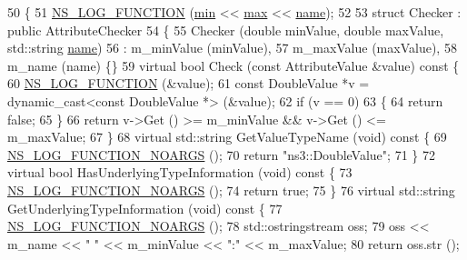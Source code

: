\begin{DoxyCode}
50 \{
51   \hyperlink{log-macros-disabled_8h_a90b90d5bad1f39cb1b64923ea94c0761}{NS\_LOG\_FUNCTION} (\hyperlink{80211b_8c_ac6afabdc09a49a433ee19d8a9486056d}{min} << \hyperlink{80211b_8c_affe776513b24d84b39af8ab0930fef7f}{max} << \hyperlink{generate__test__data__lte__spectrum__model_8m_ab74e6bf80237ddc4109968cedc58c151}{name});
52 
53   \textcolor{keyword}{struct }Checker : \textcolor{keyword}{public} AttributeChecker
54   \{
55     Checker (\textcolor{keywordtype}{double} minValue, \textcolor{keywordtype}{double} maxValue, std::string \hyperlink{generate__test__data__lte__spectrum__model_8m_ab74e6bf80237ddc4109968cedc58c151}{name})
56       : m\_minValue (minValue),
57         m\_maxValue (maxValue),
58         m\_name (name) \{\}
59     \textcolor{keyword}{virtual} \textcolor{keywordtype}{bool} Check (\textcolor{keyword}{const} AttributeValue &value)\textcolor{keyword}{ const }\{
60       \hyperlink{log-macros-disabled_8h_a90b90d5bad1f39cb1b64923ea94c0761}{NS\_LOG\_FUNCTION} (&value);
61       \textcolor{keyword}{const} DoubleValue *v = \textcolor{keyword}{dynamic\_cast<}\textcolor{keyword}{const }DoubleValue *\textcolor{keyword}{>} (&value);
62       \textcolor{keywordflow}{if} (v == 0)
63         \{
64           \textcolor{keywordflow}{return} \textcolor{keyword}{false};
65         \}
66       \textcolor{keywordflow}{return} v->Get () >= m\_minValue && v->Get () <= m\_maxValue;
67     \}
68     \textcolor{keyword}{virtual} std::string GetValueTypeName (\textcolor{keywordtype}{void})\textcolor{keyword}{ const }\{
69       \hyperlink{log-macros-disabled_8h_a8f7e4afc291c9d29a65c18ac1f79197b}{NS\_LOG\_FUNCTION\_NOARGS} ();
70       \textcolor{keywordflow}{return} \textcolor{stringliteral}{"ns3::DoubleValue"};
71     \}
72     \textcolor{keyword}{virtual} \textcolor{keywordtype}{bool} HasUnderlyingTypeInformation (\textcolor{keywordtype}{void})\textcolor{keyword}{ const }\{
73       \hyperlink{log-macros-disabled_8h_a8f7e4afc291c9d29a65c18ac1f79197b}{NS\_LOG\_FUNCTION\_NOARGS} ();
74       \textcolor{keywordflow}{return} \textcolor{keyword}{true};
75     \}
76     \textcolor{keyword}{virtual} std::string GetUnderlyingTypeInformation (\textcolor{keywordtype}{void})\textcolor{keyword}{ const }\{
77       \hyperlink{log-macros-disabled_8h_a8f7e4afc291c9d29a65c18ac1f79197b}{NS\_LOG\_FUNCTION\_NOARGS} ();
78       std::ostringstream oss;
79       oss << m\_name << \textcolor{stringliteral}{" "} << m\_minValue << \textcolor{stringliteral}{":"} << m\_maxValue;
80       \textcolor{keywordflow}{return} oss.str ();

\end{DoxyCode}
